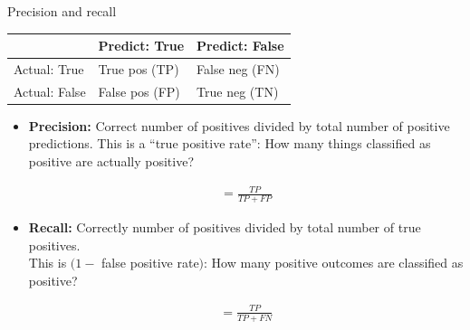 \documentclass[mathserif, aspectratio=169, xcolor=table]{beamer}
\begin{document}
\begin{frame}{Precision and recall}
\begin{table}[]
\begin{tabular}{l|l|l|}
\cline{2-3}
                                               & \cellcolor[HTML]{EFEFEF} Predict: True & \cellcolor[HTML]{EFEFEF} Predict: False \\ \hline
\multicolumn{1}{|l|}{\cellcolor[HTML]{EFEFEF}Actual: True} &      True pos (TP)                    &                False neg (FN)          \\ \hline
\multicolumn{1}{|l|}{\cellcolor[HTML]{EFEFEF}Actual: False} &           False pos (FP)              &               True neg (TN)           \\ \hline
\end{tabular}
\end{table}


\begin{itemize}
	\item \textbf{Precision:} Correct number of positives divided by total number of positive predictions. 
	This is a ``true positive rate'': How many things classified as positive are actually positive?

	\begin{align*}
		 = \frac{TP}{TP+FP}
	\end{align*}


	\item \textbf{Recall:} Correctly number of positives divided by total number of true positives. \\
	This is $(1 -$ false positive rate$)$: How many positive outcomes are classified as positive?

	\begin{align*}
		 = \frac{TP}{TP+FN}
	\end{align*}

\end{itemize}

\end{frame}
\end{document}
